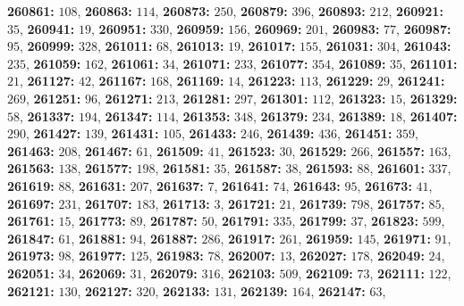 \textsf{\bfseries 260861:} $108$, \textsf{\bfseries 260863:} $114$, \textsf{\bfseries 260873:} $250$, \textsf{\bfseries 260879:} $396$, \textsf{\bfseries 260893:} $212$, \textsf{\bfseries 260921:} $35$, \textsf{\bfseries 260941:} $19$, \textsf{\bfseries 260951:} $330$, \textsf{\bfseries 260959:} $156$, \textsf{\bfseries 260969:} $201$, \textsf{\bfseries 260983:} $77$, \textsf{\bfseries 260987:} $95$, \textsf{\bfseries 260999:} $328$, \textsf{\bfseries 261011:} $68$, \textsf{\bfseries 261013:} $19$, \textsf{\bfseries 261017:} $155$, \textsf{\bfseries 261031:} $304$, \textsf{\bfseries 261043:} $235$, \textsf{\bfseries 261059:} $162$, \textsf{\bfseries 261061:} $34$, \textsf{\bfseries 261071:} $233$, \textsf{\bfseries 261077:} $354$, \textsf{\bfseries 261089:} $35$, \textsf{\bfseries 261101:} $21$, \textsf{\bfseries 261127:} $42$, \textsf{\bfseries 261167:} $168$, \textsf{\bfseries 261169:} $14$, \textsf{\bfseries 261223:} $113$, \textsf{\bfseries 261229:} $29$, \textsf{\bfseries 261241:} $269$, \textsf{\bfseries 261251:} $96$, \textsf{\bfseries 261271:} $213$, \textsf{\bfseries 261281:} $297$, \textsf{\bfseries 261301:} $112$, \textsf{\bfseries 261323:} $15$, \textsf{\bfseries 261329:} $58$, \textsf{\bfseries 261337:} $194$, \textsf{\bfseries 261347:} $114$, \textsf{\bfseries 261353:} $348$, \textsf{\bfseries 261379:} $234$, \textsf{\bfseries 261389:} $18$, \textsf{\bfseries 261407:} $290$, \textsf{\bfseries 261427:} $139$, \textsf{\bfseries 261431:} $105$, \textsf{\bfseries 261433:} $246$, \textsf{\bfseries 261439:} $436$, \textsf{\bfseries 261451:} $359$, \textsf{\bfseries 261463:} $208$, \textsf{\bfseries 261467:} $61$, \textsf{\bfseries 261509:} $41$, \textsf{\bfseries 261523:} $30$, \textsf{\bfseries 261529:} $266$, \textsf{\bfseries 261557:} $163$, \textsf{\bfseries 261563:} $138$, \textsf{\bfseries 261577:} $198$, \textsf{\bfseries 261581:} $35$, \textsf{\bfseries 261587:} $38$, \textsf{\bfseries 261593:} $88$, \textsf{\bfseries 261601:} $337$, \textsf{\bfseries 261619:} $88$, \textsf{\bfseries 261631:} $207$, \textsf{\bfseries 261637:} $7$, \textsf{\bfseries 261641:} $74$, \textsf{\bfseries 261643:} $95$, \textsf{\bfseries 261673:} $41$, \textsf{\bfseries 261697:} $231$, \textsf{\bfseries 261707:} $183$, \textsf{\bfseries 261713:} $3$, \textsf{\bfseries 261721:} $21$, \textsf{\bfseries 261739:} $798$, \textsf{\bfseries 261757:} $85$, \textsf{\bfseries 261761:} $15$, \textsf{\bfseries 261773:} $89$, \textsf{\bfseries 261787:} $50$, \textsf{\bfseries 261791:} $335$, \textsf{\bfseries 261799:} $37$, \textsf{\bfseries 261823:} $599$, \textsf{\bfseries 261847:} $61$, \textsf{\bfseries 261881:} $94$, \textsf{\bfseries 261887:} $286$, \textsf{\bfseries 261917:} $261$, \textsf{\bfseries 261959:} $145$, \textsf{\bfseries 261971:} $91$, \textsf{\bfseries 261973:} $98$, \textsf{\bfseries 261977:} $125$, \textsf{\bfseries 261983:} $78$, \textsf{\bfseries 262007:} $13$, \textsf{\bfseries 262027:} $178$, \textsf{\bfseries 262049:} $24$, \textsf{\bfseries 262051:} $34$, \textsf{\bfseries 262069:} $31$, \textsf{\bfseries 262079:} $316$, \textsf{\bfseries 262103:} $509$, \textsf{\bfseries 262109:} $73$, \textsf{\bfseries 262111:} $122$, \textsf{\bfseries 262121:} $130$, \textsf{\bfseries 262127:} $320$, \textsf{\bfseries 262133:} $131$, \textsf{\bfseries 262139:} $164$, \textsf{\bfseries 262147:} $63$, 
